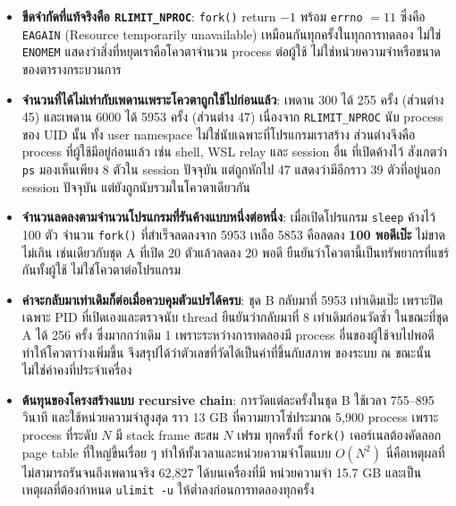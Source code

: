 \documentclass[a4paper,12pt]{article}
\newcommand{\code}[1]{\texttt{#1}}
\begin{document}
\begin{itemize}[leftmargin=*]
  \item \textbf{ขีดจำกัดที่แท้จริงคือ \code{RLIMIT\_NPROC}}:
        \code{fork()} return $-1$ พร้อม \code{errno} $= 11$ ซึ่งคือ \code{EAGAIN}
        (Resource temporarily unavailable) เหมือนกันทุกครั้งในทุกการทดลอง
        ไม่ใช่ \code{ENOMEM} แสดงว่าสิ่งที่หยุดเราคือโควตาจำนวน process ต่อผู้ใช้
        ไม่ใช่หน่วยความจำหรือขนาดของตารางกระบวนการ

  \item \textbf{จำนวนที่ได้ไม่เท่ากับเพดานเพราะโควตาถูกใช้ไปก่อนแล้ว}:
        เพดาน 300 ได้ 255 ครั้ง (ส่วนต่าง 45) และเพดาน 6000 ได้ 5953 ครั้ง
        (ส่วนต่าง 47) เนื่องจาก \code{RLIMIT\_NPROC} นับ process ของ UID นั้น
        ทั้ง user namespace ไม่ใช่นับเฉพาะที่โปรแกรมเราสร้าง ส่วนต่างจึงคือ
        process ที่ผู้ใช้มีอยู่ก่อนแล้ว เช่น shell, WSL relay และ session อื่น
        ที่เปิดค้างไว้ สังเกตว่า \code{ps} มองเห็นเพียง 8 ตัวใน session ปัจจุบัน
        แต่ถูกหักไป 47 แสดงว่ามีอีกราว 39 ตัวที่อยู่นอก session ปัจจุบัน
        แต่ยังถูกนับรวมในโควตาเดียวกัน

  \item \textbf{จำนวนลดลงตามจำนวนโปรแกรมที่รันค้างแบบหนึ่งต่อหนึ่ง}:
        เมื่อเปิดโปรแกรม \code{sleep} ค้างไว้ 100 ตัว จำนวน \code{fork()}
        ที่สำเร็จลดลงจาก 5953 เหลือ 5853 คือลดลง \textbf{100 พอดีเป๊ะ}
        ไม่ขาดไม่เกิน เช่นเดียวกับชุด A ที่เปิด 20 ตัวแล้วลดลง 20 พอดี
        ยืนยันว่าโควตานี้เป็นทรัพยากรที่แชร์กันทั้งผู้ใช้ ไม่ใช่โควตาต่อโปรแกรม

  \item \textbf{ค่าจะกลับมาเท่าเดิมก็ต่อเมื่อควบคุมตัวแปรได้ครบ}:
        ชุด B กลับมาที่ 5953 เท่าเดิมเป๊ะ เพราะปิดเฉพาะ PID ที่เปิดเองและตรวจนับ
        thread ยืนยันว่ากลับมาที่ 8 เท่าเดิมก่อนวัดซ้ำ ในขณะที่ชุด A ได้ 256 ครั้ง
        ซึ่งมากกว่าเดิม 1 เพราะระหว่างการทดลองมี process อื่นของผู้ใช้จบไปพอดี
        ทำให้โควตาว่างเพิ่มขึ้น จึงสรุปได้ว่าตัวเลขที่วัดได้เป็นค่าที่ขึ้นกับสภาพ
        ของระบบ ณ ขณะนั้น ไม่ใช่ค่าคงที่ประจำเครื่อง

  \item \textbf{ต้นทุนของโครงสร้างแบบ recursive chain}:
        การวัดแต่ละครั้งในชุด B ใช้เวลา 755--895 วินาที และใช้หน่วยความจำสูงสุด
        ราว 13 GB ที่ความยาวโซ่ประมาณ 5{,}900 process เพราะ process ที่ระดับ $N$
        มี stack frame สะสม $N$ เฟรม ทุกครั้งที่ \code{fork()} เคอร์เนลต้องคัดลอก
        page table ที่ใหญ่ขึ้นเรื่อย ๆ ทำให้ทั้งเวลาและหน่วยความจำโตแบบ $O(N^2)$
        นี่คือเหตุผลที่ไม่สามารถรันจนถึงเพดานจริง 62{,}827 ได้บนเครื่องที่มี
        หน่วยความจำ 15.7 GB และเป็นเหตุผลที่ต้องกำหนด \code{ulimit -u}
        ให้ต่ำลงก่อนการทดลองทุกครั้ง
\end{itemize}
\newpage
\end{document}

